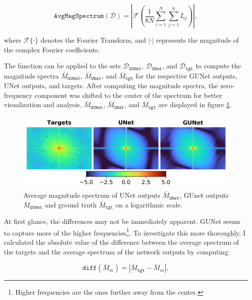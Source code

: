\begin{equation}
    \texttt{AvgMagSpectrum}(\mathcal{D}) = \left| \mathcal{F} \left( \frac{1}{8N} \sum_{i=1}^{N} \sum_{j=1}^{8} I_{ij} \right) \right|,
\end{equation}

\noindent where $\mathcal{F}\{\cdot\}$ denotes the Fourier Transform, and $|\cdot|$ represents the magnitude of the complex Fourier coefficients.

The function can be applied to the sets $\mathcal{D}_{\texttt{GUNet}}$, $\mathcal{D}_{\texttt{UNet}}$, and $\mathcal{D}_{\texttt{tgt}}$ to compute the magnitude spectra $\bar{M}_{\texttt{GUNet}}$, $\bar{M}_{\texttt{UNet}}$, and $\bar{M}_{\texttt{tgt}}$ for the respective \gls{GUNet} outputs, UNet outputs, and targets. After computing the magnitude spectra, the zero-frequency component was shifted to the center of the spectrum for better visualization and analysis. $\bar{M}_{\texttt{GUNet}}$, $\bar{M}_{\texttt{UNet}}$, and $\bar{M}_{\texttt{tgt}}$ are displayed in figure \ref{fig:fourier}.

\begin{figure}[ht]
    \centering
    \includegraphics[width=\textwidth]{images/fourier.png}
    \caption[Comparison of average fourier spectra]{\label{fig:fourier}Average magnitude spectrum of UNet outputs $\bar{M}_{\texttt{UNet}}$, GUnet outputs $\bar{M}_{\texttt{GUNet}}$ and ground truth $\bar{M}_{\texttt{tgt}}$ on a logarithmic scale.}
\end{figure}

At first glance, the differences may not be immediately apparent. \gls{GUNet} seems to capture more of the higher frequencies\footnote{Higher frequencies are the ones further away from the center.}. To investigate this more thoroughly, I calculated the absolute value of the difference between the average spectrum of the targets and the average spectrum of the network outputs by computing:

\begin{equation}
    \texttt{diff}\left(\bar{M}_{m}\right)=\left| \bar{M}_{\texttt{tgt}} - \bar{M}_{m} \right|,
\end{equation}

